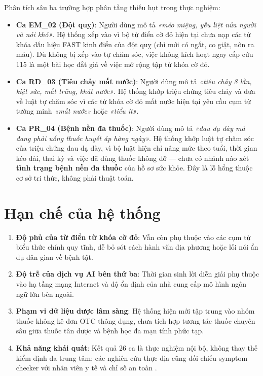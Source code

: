 Phân tích sâu ba trường hợp phân tầng thiếu hụt  trong thực nghiệm:
\begin{itemize}[leftmargin=1.6em, itemsep=2pt]
  \item \textbf{Ca EM\_02 (Đột quỵ)}: Người dùng mô tả \emph{«méo miệng, yếu liệt
        nửa người và nói khó»}. Hệ thống xếp vào  vì bộ
        từ điển cờ đỏ  hiện tại chưa nạp các từ khóa
        dấu hiệu FAST kinh điển của đột quỵ (chỉ mới có ngất, co giật, nôn ra
        máu). Dù không bị xếp vào tự chăm sóc, việc không kích hoạt ngay cấp cứu
        115 là một bài học đắt giá về việc mở rộng tập từ khóa cờ đỏ.
  \item \textbf{Ca RD\_03 (Tiêu chảy mất nước)}: Người dùng mô tả \emph{«tiêu chảy
        8 lần, kiệt sức, mắt trũng, khát nước»}. Hệ thống khớp triệu chứng tiêu
        chảy và đưa về luật tự chăm sóc vì các từ khóa cờ đỏ mất nước hiện tại
        yêu cầu cụm từ tường minh \emph{«mất nước»} hoặc \emph{«tiểu ít»}.
  \item \textbf{Ca PR\_04 (Bệnh nền đa thuốc)}: Người dùng mô tả \emph{«đau dạ dày
        mà đang phải uống thuốc huyết áp hàng ngày»}. Hệ thống khớp luật tự chăm
        sóc của triệu chứng đau dạ dày, vì bộ luật hiện chỉ nâng mức theo tuổi,
        thời gian kéo dài, thai kỳ và việc đã dùng thuốc không đỡ — chưa có nhánh
        nào xét \textbf{tình trạng bệnh nền đa thuốc} của hồ sơ sức khỏe. Đây là
        lỗ hổng thuộc cơ sở tri thức, không phải thuật toán.
\end{itemize}

\section{Hạn chế của hệ thống}

\begin{enumerate}[leftmargin=1.6em, itemsep=2pt]
  \item \textbf{Độ phủ của từ điển từ khóa cờ đỏ}: Vẫn còn phụ thuộc vào các cụm
        từ biểu thức chính quy tĩnh, dễ bỏ sót cách hành văn địa phương hoặc lối
        nói ẩn dụ dân gian về bệnh tật.
  \item \textbf{Độ trễ của dịch vụ AI bên thứ ba}: Thời gian sinh lời diễn giải
        phụ thuộc vào hạ tầng mạng Internet và độ ổn định của nhà cung cấp mô
        hình ngôn ngữ lớn bên ngoài.
  \item \textbf{Phạm vi dữ liệu dược lâm sàng}: Hệ thống hiện mới tập trung vào
        nhóm thuốc không kê đơn OTC thông dụng, chưa tích hợp tương tác thuốc
        chuyên sâu giữa thuốc tân dược và bệnh học đa mạn tính phức tạp.
  \item \textbf{Khả năng khái quát}: Kết quả 26 ca là thực nghiệm nội bộ, không
        thay thế kiểm định đa trung tâm; các nghiên cứu thực địa cũng đối chiếu
        symptom checker với nhân viên y tế và chỉ số an toàn \cite{Liu2024}.
\end{enumerate}
